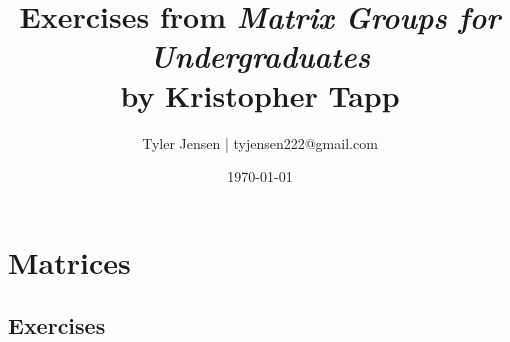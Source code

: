 \documentclass[12pt]{book}
\title{Exercises from \textit{Matrix Groups for Undergraduates} \\
       by Kristopher Tapp}
\author{Tyler Jensen | tyjensen222@gmail.com}
\date{\today}
\theoremstyle{definition}
\begin{document}
\newcommand{\R}{\mathbb{R}}    %
\newcommand{\C}{\mathbb{C}}    %
\newcommand{\Q}{\mathbb{Q}}    %
\newcommand{\Z}{\mathbb{Z}}    %
\newcommand{\N}{\mathbb{N}}    %

\newcommand{\GL}[2]{\mathrm{GL}_{#1}\!\bigl(#2\bigr)} %
\newcommand{\SL}[2]{\mathrm{SL}_{#1}\!\bigl(#2\bigr)} %

\newcommand{\Ogroup}[1]{\mathrm{O}\!\bigl(#1\bigr)}   %
\newcommand{\SO}[1]{\mathrm{SO}\!\bigl(#1\bigr)}      %
\newcommand{\Sp}[1]{\mathrm{Sp}\!\bigl(#1\bigr)}      %

\newcommand{\U}[1]{\mathrm{U}\!\bigl(#1\bigr)}        %
\newcommand{\SU}[1]{\mathrm{SU}\!\bigl(#1\bigr)}      %

\newcommand{\lie}[1]{\mathfrak{#1}}                    %
\newcommand{\so}[1]{\mathfrak{so}_{#1}}                %
\newcommand{\su}[1]{\mathfrak{su}_{#1}}                %
\newcommand{\gl}[1]{\mathfrak{gl}_{#1}}                %
\newcommand{\slalg}[1]{\mathfrak{sl}_{#1}}             %
\newcommand{\spalg}[1]{\mathfrak{sp}_{#1}}             %

\newcommand{\g}{\mathfrak{g}}                          %
\newcommand{\G}{\mathrm{G}}                            %

\frontmatter
\maketitle
\tableofcontents

\mainmatter

\chapter{Matrices}
\section{Exercises}
\end{document}
